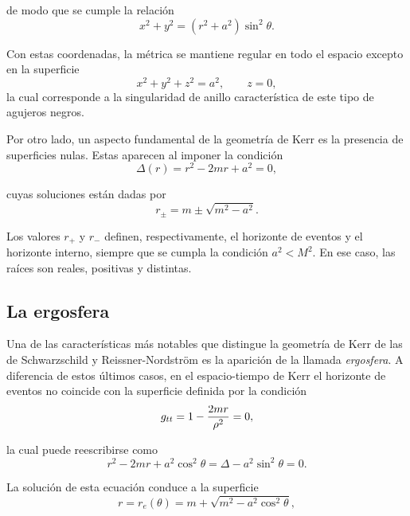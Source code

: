 de modo que se cumple la relación
\begin{equation}
    x^2+y^2=(r^2+a^2)\sin^2\theta .
\end{equation}


Con estas coordenadas, la métrica se mantiene regular en todo el espacio excepto en la superficie
\begin{equation}
    x^2+y^2+z^2=a^2 , \qquad z=0,
\end{equation}
la cual corresponde a la singularidad de anillo característica de este tipo de agujeros negros.

Por otro lado, un aspecto fundamental de la geometría de Kerr es la presencia de superficies nulas. Estas aparecen al imponer la condición
\begin{equation}
    \Delta(r)=r^2-2mr+a^2=0 ,
\end{equation}

cuyas soluciones están dadas por
\begin{equation}
    r_{\pm}=m \pm \sqrt{m^2-a^2}.
\end{equation}

Los valores $r_{+}$ y $r_{-}$ definen, respectivamente, el horizonte de eventos y el horizonte interno, siempre que se cumpla la condición $a^2<M^2$. En ese caso, las raíces son reales, positivas y distintas.

\subsection{La ergosfera}

Una de las características más notables que distingue la geometría de Kerr de las de Schwarzschild y Reissner-Nordström es la aparición de la llamada \textit{ergosfera}. A diferencia de estos últimos casos, en el espacio-tiempo de Kerr el horizonte de eventos no coincide con la superficie definida por la condición
\begin{equation}
    g_{tt}=1-\frac{2mr}{\rho^2}=0,
\end{equation}

la cual puede reescribirse como
\begin{equation}
    r^2-2mr+a^2\cos^2\theta = \Delta - a^2\sin^2\theta = 0 .
\end{equation}

La solución de esta ecuación conduce a la superficie
\begin{equation}
    r=r_e(\theta)=m+\sqrt{m^2-a^2\cos^2\theta},
\end{equation}


